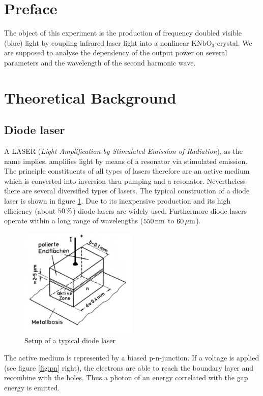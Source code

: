 \documentclass{protokoll_en}
\begin{document}
\section{Preface}
The object of this experiment is the production of frequency doubled visible (blue) light by coupling infrared laser light into a nonlinear $\mathrm{KNbO}_3$-crystal. We are supposed to analyse the dependency of the output power on several parameters and the wavelength of the second harmonic wave.

\section{Theoretical Background}
\subsection{Diode laser}
A LASER (\emph{Light Amplification by Stimulated Emission of Radiation}), as the name implies, amplifies light by means of a resonator via stimulated emission. The principle constituents of all types of lasers therefore are an active medium which is converted into inversion thru pumping and a resonator. Nevertheless there are several diversified types of lasers. The typical construction of a diode laser is shown in figure \ref{fig:laser}. Due to its inexpensive production and its high efficiency (about $\unit[50]{\%}$) diode lasers are widely-used. Furthermore diode lasers operate within a long range of wavelengths ($\unit[550]{nm}$ to $\unit[60]{\mu m}$).
\begin{figure}[H]
	\centering
		\includegraphics[width=0.5\textwidth]{graphics/laser}
	\caption{Setup of a typical diode laser~\cite{demtroed}}
	\label{fig:laser}
\end{figure}
The active medium is represented by a biased p-n-junction. If a voltage is applied (see figure \ref{fig:pn} right), the electrons are able to reach the boundary layer and recombine with the holes. Thus a photon of an energy correlated with the gap energy is emitted.
\end{document}
